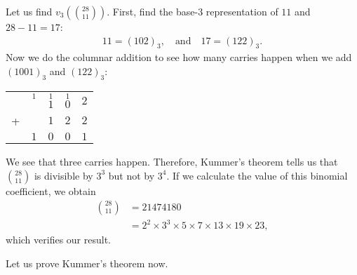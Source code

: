 \documentclass[12pt]{subfile}
\begin{document}
\begin{example}
	Let us find $v_3\left( \binom{28}{11}\right)$. First, find the base-$3$ representation of $11$ and $28-11=17$:
		\begin{align*}
			11 = (102)_3, \quad \text{and} \quad 17 = (122)_3.
		\end{align*}
	Now we do the columnar addition to see how many carries happen when we add $(1001)_3$ and $(122)_3$:
		\begin{center}
			\begin{tabular}{c*{4}{@{\,}c}}
				 &  $\overset{1}{\phantom{1}}$   & $\overset{1}{1}$ & $\overset{1}{0}$ & $2$\\
				+& 		& $1$				   & $2$ 			  	  & $2$\\ \hline
				 & $1$	& $0$				   & $0$ 			      & $1$\\
			\end{tabular}
		\end{center}
	We see that three carries happen. Therefore, Kummer's theorem tells us that $\binom{28}{11}$ is divisible by $3^3$ but not by $3^4$. If we calculate the value of this binomial coefficient, we obtain
		\begin{align*}
			\binom{28}{11} &= 21474180\\
						   &= 2^2 \times 3^3 \times 5 \times 7 \times 13 \times 19 \times 23,
		\end{align*}
	which verifies our result.

Let us prove Kummer's theorem now.
	
\end{example}
\end{document}
